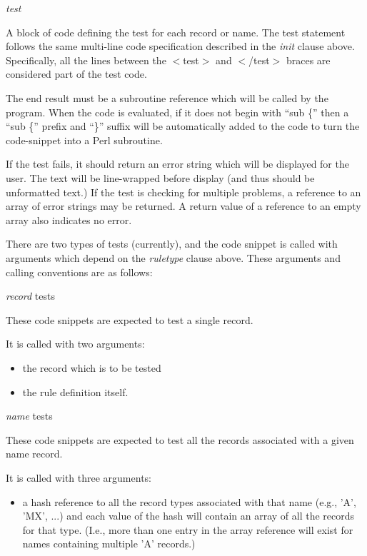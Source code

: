 \begin{description}
\item {\it test}\verb" "

A block of code defining the test for each record or name.  The
test statement follows the same multi-line code specification
described in the {\it init} clause above.  Specifically, all the lines
between the $<$test$>$ and $<$/test$>$ braces are considered part of the test
code.

The end result must be a subroutine reference which will be called by
the  program.  When the code is evaluated, if it does not
begin with ``sub \{'' then a ``sub \{'' prefix and ``\}'' suffix will be
automatically added to the code to turn the code-snippet into a
Perl subroutine.

If the test fails, it should return an error string which will be displayed
for the user.  The text will be line-wrapped before display (and thus should
be unformatted text.)  If the test is checking for multiple problems, a
reference to an array of error strings may be returned.  A return value of a
reference to an empty array also indicates no error.

There are two types of tests (currently), and the code snippet is
called with arguments which depend on the {\it ruletype} clause above.
These arguments and calling conventions are as follows:

\begin{description}

\item {\it record} tests\verb" "

These code snippets are expected to test a single  record.

It is called with two arguments:

\begin{itemize}
\item the record which is to be tested
\item the rule definition itself.
\end{itemize}

\item {\it name} tests\verb" "

These code snippets are expected to test all the records
associated with a given name record.

It is called with three arguments:

\begin{itemize}
\item a hash reference to all the record types associated with that name
(e.g., 'A', 'MX', ...) and each value of the hash will contain an array of all
the records for that type.  (I.e., more than one entry in the array reference
will exist for names containing multiple 'A' records.)


\end{itemize}
\end{description}
\end{description}

